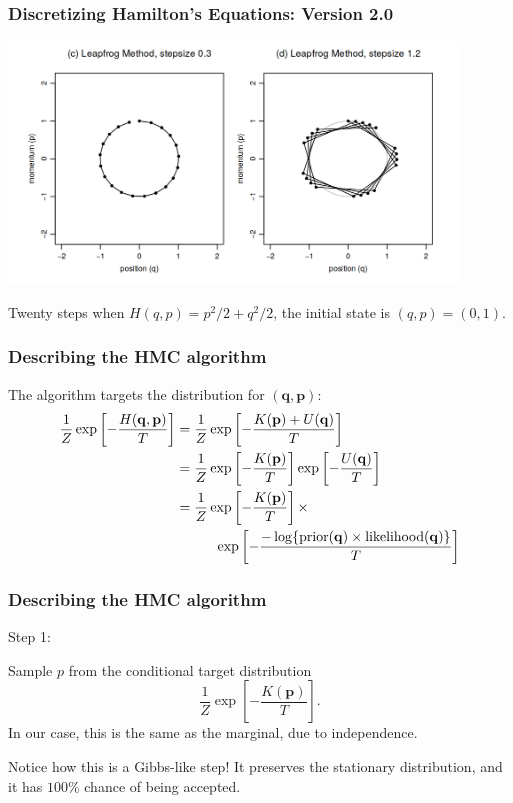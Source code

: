 \documentclass{beamer}
\begin{document}
\begin{frame}
\frametitle{Discretizing Hamilton's Equations: Version 2.0}

\begin{center}
\includegraphics[width=120mm]{leapfrog_method.png}
\end{center}

Twenty steps when $H(q,p) = p^2/2 + q^2/2$, the initial state is $(q,p) = (0,1)$.

\end{frame}
\begin{frame}
\frametitle{Describing the HMC algorithm}

The algorithm targets the distribution for $(\mathbf{q}, \mathbf{p})$:
\begin{align*}
\frac{1}{Z}\exp\left[-\frac{H(\mathbf{q}, \mathbf{p})}{T} \right] &= \frac{1}{Z}\exp\left[-\frac{K(\mathbf{p}) + U(\mathbf{q})}{T} \right] \\
&= \frac{1}{Z}\exp\left[-\frac{K(\mathbf{p})}{T} \right]\exp\left[-\frac{U(\mathbf{q})}{T}\right] \\
&= \frac{1}{Z}\exp\left[-\frac{K(\mathbf{p})}{T} \right] \times \\
&\hspace{10mm} \exp\left[-\frac{-\log\{\text{prior}(\mathbf{q}) \times \text{likelihood}(\mathbf{q}) \}  }{T}\right] 
\end{align*}


\end{frame}

\begin{frame}
\frametitle{Describing the HMC algorithm}

Step 1: 
\newline

Sample $p$ from the conditional target distribution
$$
\frac{1}{Z}\exp\left[-\frac{K(\mathbf{p})}{T} \right].
$$
In our case, this is the same as the marginal, due to independence.
\newline

Notice how this is a Gibbs-like step! It preserves the stationary distribution, and it has $100$\% chance of being accepted.


\end{frame}
\end{document}
